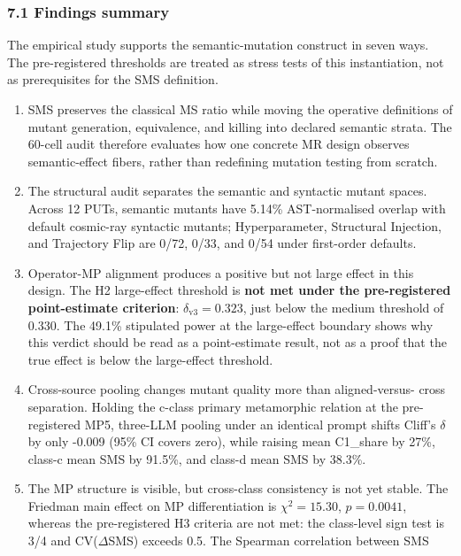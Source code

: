 \documentclass[review,12pt,authoryear]{elsarticle}
\begin{document}
\subsubsection{7.1 Findings summary}\label{findings-summary}

The empirical study supports the semantic-mutation construct in seven
ways. The pre-registered thresholds are treated as stress tests of this
instantiation, not as prerequisites for the SMS definition.

\begin{enumerate}
\def\labelenumi{(\alph{enumi})}
\item
  SMS preserves the classical MS ratio while moving the operative
  definitions of mutant generation, equivalence, and killing into
  declared semantic strata. The 60-cell audit therefore evaluates how
  one concrete MR design observes semantic-effect fibers, rather than
  redefining mutation testing from scratch.
\item
  The structural audit separates the semantic and syntactic mutant
  spaces. Across 12 PUTs, semantic mutants have 5.14\% AST-normalised
  overlap with default cosmic-ray syntactic mutants; Hyperparameter,
  Structural Injection, and Trajectory Flip are 0/72, 0/33, and 0/54
  under first-order defaults.
\item
  Operator-MP alignment produces a positive but not large effect in this
  design. The H2 large-effect threshold is \textbf{not met under the
  pre-registered point-estimate criterion}: \(\delta_{\mathrm{v3}} =
  0.323\), just below the \citet{romano2006cliff} medium threshold of
  0.330. The 49.1\% stipulated power at the large-effect boundary shows
  why this verdict should be read as a point-estimate result, not as a
  proof that the true effect is below the large-effect threshold.
\item
  Cross-source pooling changes mutant quality more than aligned-versus-
  cross separation. Holding the c-class primary metamorphic relation at
  the pre-registered MP5, three-LLM pooling under an identical prompt
  shifts Cliff's \(\delta\) by only -0.009 (95\% CI covers zero), while
  raising mean C1\_share by 27\%, class-c mean SMS by 91.5\%, and
  class-d mean SMS by 38.3\%.
\item
  The MP structure is visible, but cross-class consistency is not yet
  stable. The Friedman main effect on MP differentiation is
  \(\chi^2 = 15.30\), \(p = 0.0041\), whereas the pre-registered H3
  criteria are not met: the class-level sign test is 3/4 and
  CV(\(\Delta\)SMS) exceeds 0.5. The Spearman correlation between SMS

\end{enumerate}
\end{document}
